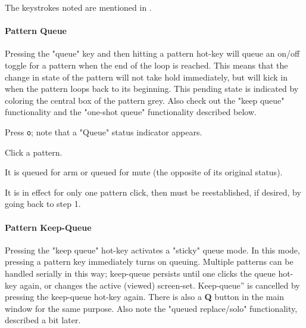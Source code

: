    The keystrokes noted are mentioned in
   .

\paragraph{Pattern Queue}
\label{paragraph:patterns_pattern_queue}

   Pressing the "queue" key and then hitting a pattern hot-key
   will queue an on/off toggle for a pattern when the end of the loop is
   reached.
   This means that the change in state of the pattern will not take hold
   immediately, but will kick in when the pattern loops back to its beginning.
   This pending state is indicated by coloring the central box of the
   pattern grey.
   Also check out the "keep queue" functionality and
   the "one-shot queue" functionality described below.

   \begin{enumber}
      \item Press \texttt{o}; note that a "Queue" status indicator appears.
      \item Click a pattern.
      \item It is queued for arm or queued for mute (the opposite of its
         original status).
      \item It is in effect for only one pattern click, then must be
         reestablished, if desired, by going back to step 1.
   \end{enumber}

%

\paragraph{Pattern Keep-Queue}
\label{paragraph:patterns_pattern_keep_queue}

   Pressing the "keep queue" hot-key activates a "sticky" queue mode.
   In this mode, pressing a pattern key immediately turns on queuing.
   Multiple patterns can be handled serially in this way;
   keep-queue persists until one clicks the queue hot-key again,
   or changes the active (viewed) screen-set. 
   Keep-queue” is cancelled by pressing the keep-queue hot-key again.
   There is also a \textbf{Q} button in the main window
   for the same purpose.
   Also note the "queued replace/solo" functionality, described a bit later.

